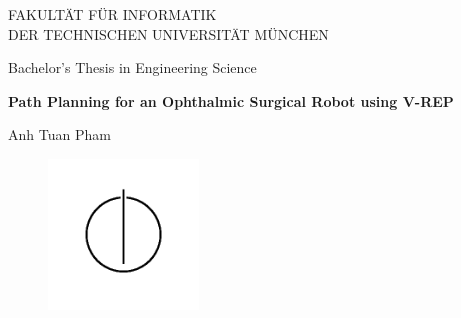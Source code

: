 \thispagestyle{empty}

\vspace{4cm}
\begin{center}
  \oTUM{4cm}

  \vspace{5mm}
  \huge FAKULT{\"A}T F{\"U}R INFORMATIK\\
  \vspace{0.5cm}
  \large DER TECHNISCHEN UNIVERSIT{\"A}T M{\"U}NCHEN\\
  \vspace{1mm}

\end{center}


\vspace{15mm}
\begin{center}

  {\Large Bachelor's Thesis in Engineering Science}

  \vspace{20mm}

  {\huge\textbf{Path Planning for an Ophthalmic Surgical Robot using V-REP}}\\%


  \vspace{15mm}


  {\LARGE  Anh Tuan Pham}


  \vspace{5mm}
  


  \begin{figure}[h!]
    \centering
    \includegraphics[width=4cm]{styles/informat.png}
  \end{figure}


\end{center}

